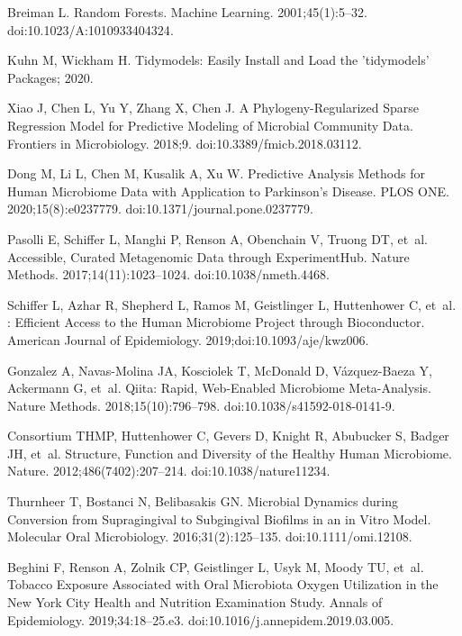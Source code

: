 \documentclass[10pt,letterpaper]{article}
\begin{document}
\begin{thebibliography}{10}
Breiman L.
\newblock Random {{Forests}}.
\newblock Machine Learning. 2001;45(1):5--32.
\newblock doi:{10.1023/A:1010933404324}.

Kuhn M, Wickham H.
\newblock Tidymodels: {{Easily}} Install and Load the 'tidymodels' Packages;
  2020.

Xiao J, Chen L, Yu Y, Zhang X, Chen J.
\newblock A {{Phylogeny}}-{{Regularized Sparse Regression Model}} for
  {{Predictive Modeling}} of {{Microbial Community Data}}.
\newblock Frontiers in Microbiology. 2018;9.
\newblock doi:{10.3389/fmicb.2018.03112}.

Dong M, Li L, Chen M, Kusalik A, Xu W.
\newblock Predictive Analysis Methods for Human Microbiome Data with
  Application to {{Parkinson}}'s Disease.
\newblock PLOS ONE. 2020;15(8):e0237779.
\newblock doi:{10.1371/journal.pone.0237779}.

Pasolli E, Schiffer L, Manghi P, Renson A, Obenchain V, Truong DT, et~al.
\newblock Accessible, Curated Metagenomic Data through {{ExperimentHub}}.
\newblock Nature Methods. 2017;14(11):1023--1024.
\newblock doi:{10.1038/nmeth.4468}.

Schiffer L, Azhar R, Shepherd L, Ramos M, Geistlinger L, Huttenhower C, et~al.
: {{Efficient}} Access to the Human Microbiome Project
  through Bioconductor.
\newblock American Journal of Epidemiology. 2019;doi:{10.1093/aje/kwz006}.

Gonzalez A, {Navas-Molina} JA, Kosciolek T, McDonald D, {V{\'a}zquez-Baeza} Y,
  Ackermann G, et~al.
\newblock Qiita: Rapid, Web-Enabled Microbiome Meta-Analysis.
\newblock Nature Methods. 2018;15(10):796--798.
\newblock doi:{10.1038/s41592-018-0141-9}.

Consortium THMP, Huttenhower C, Gevers D, Knight R, Abubucker S, Badger JH,
  et~al.
\newblock Structure, Function and Diversity of the Healthy Human Microbiome.
\newblock Nature. 2012;486(7402):207--214.
\newblock doi:{10.1038/nature11234}.

Thurnheer T, Bostanci N, Belibasakis GN.
\newblock Microbial Dynamics during Conversion from Supragingival to
  Subgingival Biofilms in an in Vitro Model.
\newblock Molecular Oral Microbiology. 2016;31(2):125--135.
\newblock doi:{10.1111/omi.12108}.

Beghini F, Renson A, Zolnik CP, Geistlinger L, Usyk M, Moody TU, et~al.
\newblock Tobacco Exposure Associated with Oral Microbiota Oxygen Utilization
  in the {{New York City Health}} and {{Nutrition Examination Study}}.
\newblock Annals of Epidemiology. 2019;34:18--25.e3.
\newblock doi:{10.1016/j.annepidem.2019.03.005}.


\end{thebibliography}
\end{document}
